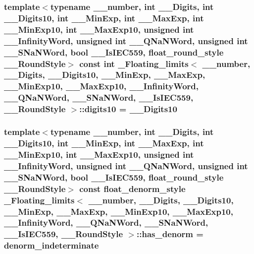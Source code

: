 \subsubsection[{digits10}]{\setlength{\rightskip}{0pt plus 5cm}template$<$typename \+\_\+\+\_\+number, int \+\_\+\+\_\+\+Digits, int \+\_\+\+\_\+\+Digits10, int \+\_\+\+\_\+\+Min\+Exp, int \+\_\+\+\_\+\+Max\+Exp, int \+\_\+\+\_\+\+Min\+Exp10, int \+\_\+\+\_\+\+Max\+Exp10, unsigned int \+\_\+\+\_\+\+Infinity\+Word, unsigned int \+\_\+\+\_\+\+Q\+Na\+N\+Word, unsigned int \+\_\+\+\_\+\+S\+Na\+N\+Word, bool \+\_\+\+\_\+\+Is\+I\+E\+C559, float\+\_\+round\+\_\+style \+\_\+\+\_\+\+Round\+Style$>$ const int {\bf \+\_\+\+Floating\+\_\+limits}$<$ \+\_\+\+\_\+number, \+\_\+\+\_\+\+Digits, \+\_\+\+\_\+\+Digits10, \+\_\+\+\_\+\+Min\+Exp, \+\_\+\+\_\+\+Max\+Exp, \+\_\+\+\_\+\+Min\+Exp10, \+\_\+\+\_\+\+Max\+Exp10, \+\_\+\+\_\+\+Infinity\+Word, \+\_\+\+\_\+\+Q\+Na\+N\+Word, \+\_\+\+\_\+\+S\+Na\+N\+Word, \+\_\+\+\_\+\+Is\+I\+E\+C559, \+\_\+\+\_\+\+Round\+Style $>$\+::digits10 = \+\_\+\+\_\+\+Digits10\hspace{0.3cm}{\ttfamily [static]}}\label{class__Floating__limits_a89a2f278cb5adf1850eb9025a570d053}
\hypertarget{class__Floating__limits_a634a0bceffb0c5392f002c42b9286281}{}
\subsubsection[{has\+\_\+denorm}]{\setlength{\rightskip}{0pt plus 5cm}template$<$typename \+\_\+\+\_\+number, int \+\_\+\+\_\+\+Digits, int \+\_\+\+\_\+\+Digits10, int \+\_\+\+\_\+\+Min\+Exp, int \+\_\+\+\_\+\+Max\+Exp, int \+\_\+\+\_\+\+Min\+Exp10, int \+\_\+\+\_\+\+Max\+Exp10, unsigned int \+\_\+\+\_\+\+Infinity\+Word, unsigned int \+\_\+\+\_\+\+Q\+Na\+N\+Word, unsigned int \+\_\+\+\_\+\+S\+Na\+N\+Word, bool \+\_\+\+\_\+\+Is\+I\+E\+C559, float\+\_\+round\+\_\+style \+\_\+\+\_\+\+Round\+Style$>$ const {\bf float\+\_\+denorm\+\_\+style} {\bf \+\_\+\+Floating\+\_\+limits}$<$ \+\_\+\+\_\+number, \+\_\+\+\_\+\+Digits, \+\_\+\+\_\+\+Digits10, \+\_\+\+\_\+\+Min\+Exp, \+\_\+\+\_\+\+Max\+Exp, \+\_\+\+\_\+\+Min\+Exp10, \+\_\+\+\_\+\+Max\+Exp10, \+\_\+\+\_\+\+Infinity\+Word, \+\_\+\+\_\+\+Q\+Na\+N\+Word, \+\_\+\+\_\+\+S\+Na\+N\+Word, \+\_\+\+\_\+\+Is\+I\+E\+C559, \+\_\+\+\_\+\+Round\+Style $>$\+::has\+\_\+denorm = {\bf denorm\+\_\+indeterminate}\hspace{0.3cm}{\ttfamily [static]}}\label{class__Floating__limits_a634a0bceffb0c5392f002c42b9286281}
\hypertarget{class__Floating__limits_ad035ac78d3f3c86f752002d807f0aafe}{}
